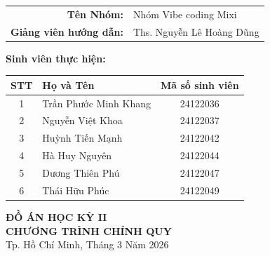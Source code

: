 \begin{titlepage}
\begin{center}
    \vspace{1.2cm}
    
    \begin{tabular}{rl}
        \textbf{Tên Nhóm:} & Nhóm Vibe coding Mixi \\
        \textbf{Giảng viên hướng dẫn:} & Ths. Nguyễn Lê Hoàng Dũng
    \end{tabular}
    
    \vspace{0.5cm}
    
    {\fontsize{13pt}{15pt}\selectfont \textbf{Sinh viên thực hiện:}} \\
    \vspace{0.2cm}
    \begin{tabular}{|c|l|c|}
        \hline
        \textbf{STT} & \textbf{Họ và Tên} & \textbf{Mã số sinh viên} \\
        \hline
        1 & Trần Phước Minh Khang & 24122036 \\
        \hline
        2 & Nguyễn Việt Khoa & 24122037 \\
        \hline
        3 & Huỳnh Tiến Mạnh & 24122042 \\
        \hline
        4 & Hà Huy Nguyên & 24122044 \\
        \hline
        5 & Dương Thiên Phú & 24122047 \\
        \hline
        6 & Thái Hữu Phúc & 24122049 \\
        \hline
    \end{tabular}
    
    \vspace{15pt}
    
    {\fontsize{13pt}{15pt}\selectfont \textbf{ĐỒ ÁN HỌC KỲ II}} \\
    {\fontsize{13pt}{15pt}\selectfont \textbf{CHƯƠNG TRÌNH CHÍNH QUY}} \\
    \vspace{0.4cm}
    {\fontsize{12pt}{14pt}\selectfont Tp. Hồ Chí Minh, Tháng 3 Năm 2026}
\end{center}
\end{titlepage}